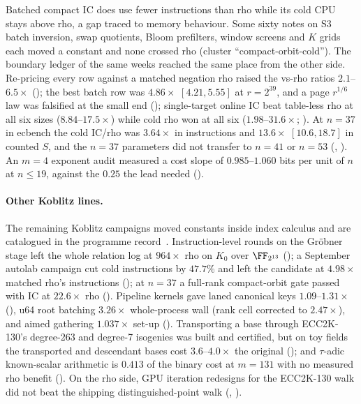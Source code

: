 Batched compact IC does use fewer instructions than rho while its cold CPU
stays above rho, a gap traced to memory behaviour. Some sixty notes on S3
batch inversion, swap quotients, Bloom prefilters, window screens and $K$
grids each moved a constant and none crossed rho (cluster
``compact-orbit-cold'').
The boundary ledger of the same weeks reached the same place from the other
side. Re-pricing every row against a matched negation rho raised the vs-rho
ratios $2.1$--$6.5\times$ (); the
best batch row was $4.86\times$ $[4.21,5.55]$ at $r=2^{39}$, and a page
$r^{1/6}$ law was falsified at the small end
(); single-target online IC beat
table-less rho at all six sizes ($8.84$--$17.5\times$) while cold rho won at
all six ($1.98$--$31.6\times$; ).
At $n=37$ in ecbench the cold IC/rho was $3.64\times$ in instructions and
$13.6\times$ $[10.6,18.7]$ in counted $S$, and the $n=37$ parameters did not
transfer to $n=41$ or $n=53$
(,
). An $m=4$ exponent
audit measured a cost slope of $0.985$--$1.060$ bits per unit of $n$ at
$n\le19$, against the $0.25$ the lead needed
().

\paragraph{Other Koblitz lines.} The remaining Koblitz campaigns moved
constants inside index calculus and are catalogued in
the programme record~\cite{icprogram2026}. Instruction-level rounds on the Gröbner stage
left the whole relation log at $964\times$ rho on $K_0$ over $\FF_{2^{13}}$
(); a September autolab
campaign cut cold instructions by $47.7\%$ and left the candidate at
$4.98\times$ matched rho's instructions ();
at $n=37$ a full-rank compact-orbit gate passed with IC at $22.6\times$ rho
().
Pipeline kernels gave laned canonical keys $1.09$--$1.31\times$
(), u64 root batching
$3.26\times$ whole-process wall (rank cell corrected to $2.47\times$), and
aimed gathering $1.037\times$ set-up ().
Transporting a base through ECC2K-130's degree-263 and degree-7 isogenies
was built and certified, but on toy fields the transported and descendant
bases cost $3.6$--$4.0\times$ the original
(); and $\tau$-adic
known-scalar arithmetic is $0.413$ of the binary cost at $m=131$ with no
measured rho benefit
().
On the rho side, GPU iteration redesigns for the ECC2K-130 walk did not
beat the shipping distinguished-point walk
(,
).

